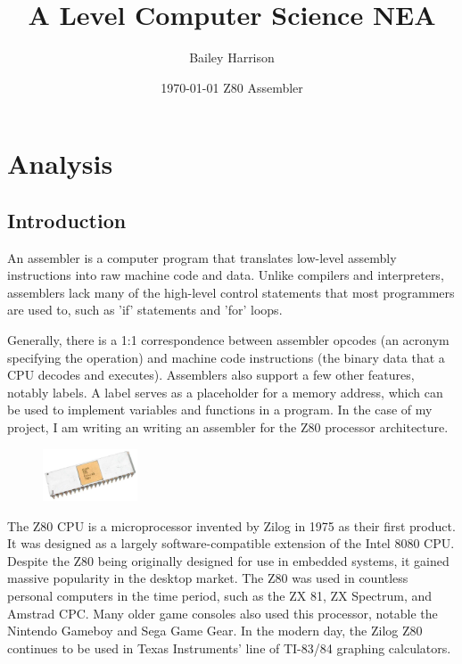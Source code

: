 \documentclass[a4paper]{report}
\title{A Level Computer Science NEA}
\author{Bailey Harrison}
\date{
	\today\endgraf\bigskip
	Z80 Assembler
}
\begin{document}
\maketitle

\tableofcontents



\chapter{Analysis}

\section{Introduction}

An assembler is a computer program that translates low-level assembly
instructions into raw machine code and data. Unlike compilers and interpreters,
assemblers lack many of the high-level control statements that most programmers
are used to, such as 'if' statements and 'for' loops.

Generally, there is a 1:1 correspondence between assembler opcodes (an acronym
specifying the operation) and machine code instructions (the binary data that a
CPU decodes and executes). Assemblers also support a few other features, notably
labels. A label serves as a placeholder for a memory address, which can be used
to implement variables and functions in a program. In the case of my project, I
am writing an writing an assembler for the Z80 processor architecture.

\bigskip

\begin{figure}
    \centering
    \includegraphics[width=0.25\textwidth]{z80}
\end{figure}

The Z80 CPU is a microprocessor invented by Zilog in 1975 as their first
product. It was designed as a largely software-compatible extension of the Intel
8080 CPU. Despite the Z80 being originally designed for use in embedded systems,
it gained massive popularity in the desktop market. The Z80 was used in
countless personal computers in the time period, such as the ZX 81, ZX Spectrum,
and Amstrad CPC. Many older game consoles also used this processor, notable the
Nintendo Gameboy and Sega Game Gear. In the modern day, the Zilog Z80 continues
to be used in Texas Instruments' line of TI-83/84 graphing calculators.
\end{document}
